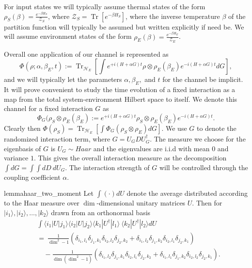 \documentclass{article}
\newcommand{\ket}[1]{|#1\rangle}
\newcommand{\bra}[1]{\langle #1|}
\newcommand{\parens}[1]{\left( #1 \right)}
\newcommand{\brackets}[1]{\left[ #1 \right]}
\DeclareMathOperator{\Tr}{Tr}
\newcommand{\trace}[1]{\Tr \brackets{ #1 }}
\newcommand{\partrace}[2]{\Tr_{#1} \brackets{ #2 }}
\newcommand{\hilb}{\mathcal{H}}
\newcommand{\partfun}{\mathcal{Z}}
\begin{document}
For input states we will typically assume thermal states of the form $\rho_S(\beta) = \frac{e^{-\beta H_S}}{\partfun_S}$, where $\partfun_S = \trace{e^{-\beta H_S}}$, where the inverse temperature $\beta$ of the partition function will typically be assumed but written explicitly if need be. We will assume environment states of the form $\rho_E(\beta) = \frac{e^{-\beta H_E}}{\partfun_E}$.


Overall one application of our channel is represented as
\begin{equation}
    \Phi(\rho ; \alpha, \beta_E, t) :=  \partrace{\hilb_E}{\int e^{+i(H + \alpha G)t} \rho \otimes \rho_E(\beta_E) e^{-i(H + \alpha G) t} dG},
\end{equation}
and we will typically let the parameters $\alpha, \beta_E,$ and $t$ for the channel be implicit. It will prove convenient to study the time evolution of a fixed interaction as a map from the total system-environment Hilbert space to itself. We denote this channel for a fixed interaction $G$ as
\begin{equation}
    \Phi_G(\rho_S \otimes \rho_E(\beta_E) := e^{+i (H+ \alpha G) t} \rho_S \otimes \rho_E(\beta_E) e^{-i (H + \alpha G) t}. \label{eq:phi_g_definition}
\end{equation}
Clearly then $\Phi(\rho_S) = \partrace{\hilb_E}{\int \Phi_G (\rho_S \otimes \rho_E) dG}$. We use $G$ to denote the randomized interaction term, where $G = U_G D U_G^\dagger$. The measure we choose for the eigenbasis of $G$ is $U_G \sim Haar$ and the eigenvalues are i.i.d with mean 0 and variance $1$.  This gives the overall interaction measure as the decomposition $\int dG = \int \int dD ~ dU_G$. The interaction strength of $G$ will be controlled through the coupling coefficient $\alpha$.

\begin{restatable}{lemma}{haar_two_moment} \label{lem:haar_two_moment}
    Let $\int (\cdot) dU$ denote the average distributed according to the Haar measure over $\dim$-dimensional unitary matrices $U$. Then for $\ket{i_1},\ket{i_2},\ldots,\ket{k_2}$ drawn from an orthonormal basis
    \begin{align}
        &\int \bra{i_1} U \ket{j_1} \bra{i_2} U \ket{j_2} \bra{k_1} U^\dagger \ket{l_1} ~ \bra{k_2} U^\dagger \ket{l_2} dU \nonumber \\
        &= ~\frac{1}{\dim^2 - 1} \parens{\delta_{i_1, l_1} \delta_{j_1, k_1} \delta_{i_2, l_2} \delta_{j_2, k_2} + \delta_{i_1, l_2} \delta_{j_1, k_2} \delta_{i_2, l_1} \delta_{j_2, k_1}} \nonumber \\
        &\quad - \frac{1}{\dim(\dim^2 - 1)} \parens{\delta_{i_1, l_2} \delta_{j_1, k_1} \delta_{i_2, l_1} \delta_{j_2, k_2} + \delta_{i_1, l_1} \delta_{j_1, k_2} \delta_{i_2, l_2} \delta_{j_2, k_1}}. \label{eq:haar_two_moment_integral}
    \end{align}
\end{restatable}
\end{document}
